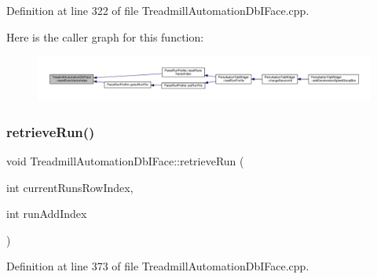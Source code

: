 Definition at line 322 of file Treadmill\+Automation\+Db\+I\+Face.\+cpp.

Here is the caller graph for this function\+:
\nopagebreak
\begin{figure}[H]
\begin{center}
\leavevmode
\includegraphics[width=350pt]{class_treadmill_automation_db_i_face_a2e1eb7dbfcfd5f83b841d9f925df5b56_icgraph}
\end{center}
\end{figure}
\mbox{\label{class_treadmill_automation_db_i_face_ab18ea9e92e892e01393d6d9a597b4b13}} 
\subsubsection{\texorpdfstring{retrieve\+Run()}{retrieveRun()}}
{\footnotesize\ttfamily void Treadmill\+Automation\+Db\+I\+Face\+::retrieve\+Run (\begin{DoxyParamCaption}\item[{int}]{current\+Runs\+Row\+Index,  }\item[{int}]{run\+Add\+Index }\end{DoxyParamCaption})}



Definition at line 373 of file Treadmill\+Automation\+Db\+I\+Face.\+cpp.

